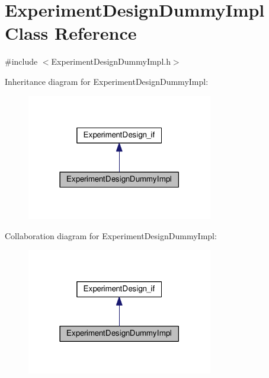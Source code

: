 \hypertarget{class_experiment_design_dummy_impl}{}\section{Experiment\+Design\+Dummy\+Impl Class Reference}
\label{class_experiment_design_dummy_impl}


{\ttfamily \#include $<$Experiment\+Design\+Dummy\+Impl.\+h$>$}



Inheritance diagram for Experiment\+Design\+Dummy\+Impl\+:
\nopagebreak
\begin{figure}[H]
\begin{center}
\leavevmode
\includegraphics[width=230pt]{class_experiment_design_dummy_impl__inherit__graph}
\end{center}
\end{figure}


Collaboration diagram for Experiment\+Design\+Dummy\+Impl\+:
\nopagebreak
\begin{figure}[H]
\begin{center}
\leavevmode
\includegraphics[width=230pt]{class_experiment_design_dummy_impl__coll__graph}
\end{center}
\end{figure}
